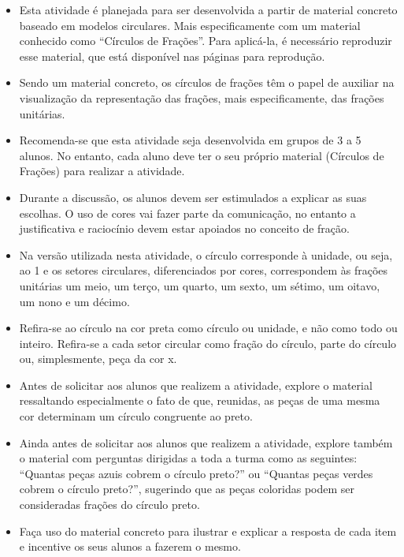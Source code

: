\begin{multicols}{2}
\begin{itemize}
\item    Esta atividade é planejada para ser desenvolvida a partir de material concreto baseado em modelos circulares. Mais especificamente com um material conhecido como ``Círculos de Frações''. Para aplicá-la, é necessário reproduzir esse material, que está disponível nas páginas para reprodução.
\item Sendo um material concreto, os círculos de frações têm o papel de auxiliar na visualização da representação das frações, mais especificamente, das frações unitárias.
\item Recomenda-se que esta atividade seja desenvolvida em grupos de 3 a 5 alunos. No entanto, cada aluno deve ter o seu próprio material (Círculos de Frações) para realizar a atividade.
\item Durante a discussão, os alunos devem ser estimulados a explicar as suas escolhas. O uso de cores vai fazer parte da comunicação, no entanto a justificativa e raciocínio devem estar apoiados no conceito de fração. %
 \item Na versão utilizada nesta atividade, o círculo corresponde à unidade, ou seja, ao 1 e os setores circulares, diferenciados por cores, correspondem às frações unitárias um meio, um terço, um quarto, um sexto, um sétimo, um oitavo, um nono e um décimo.
    \item Refira-se ao círculo na cor preta como círculo ou unidade, e não como todo ou inteiro. Refira-se a cada setor circular como fração do círculo, parte do círculo ou, simplesmente, peça da cor x.
    \item Antes de solicitar aos alunos que realizem a atividade, explore o material ressaltando especialmente o fato de que, reunidas, as peças de uma mesma cor determinam um círculo congruente ao preto.
    \item Ainda antes de solicitar aos alunos que realizem a atividade, explore também o material com perguntas dirigidas a toda a turma como as seguintes: ``Quantas peças azuis cobrem o círculo preto?'' ou ``Quantas peças verdes cobrem o círculo preto?'', sugerindo que as peças coloridas podem ser consideradas frações do círculo preto.
    \item Faça uso do material concreto para ilustrar e explicar a resposta de cada item e incentive os seus alunos a fazerem o mesmo.

\end{itemize}
\end{multicols}
